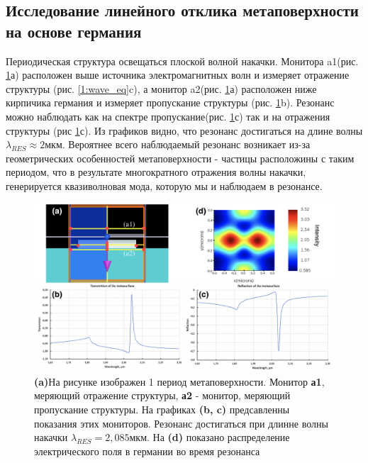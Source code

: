 \subsection{Исследование линейного отклика метаповерхности на основе германия}
\hspace{2mm}
Периодическая структура освещаться плоской волной накачки. Монитора a1(рис.  \ref{base2}а) расположен выше источника электромагнитных волн и измеряет отражение структуры (рис. \ref{1:wave_eq}c), а монитор a2(рис. \ref{base2}а) расположен ниже кирпичика германия и измеряет пропускание структуры (рис. \ref{base2}b). Резонанс можно наблюдать как на спектре пропускание(рис. \ref{base2}с) так и на отражения структуры (рис \ref{base2}с).  Из графиков видно, что резонанс достигаться на длине волны  $\lambda_{RES} \approx 2$мкм. 
\hspace{2mm}
 Вероятнее всего наблюдаемый резонанс возникает из-за геометрических особенностей метаповерхности - частицы расположины с таким периодом, что в результате многократного отражения волны накачки, генерируется квазиволновая мода, которую мы и наблюдаем в резонансе.
\begin{figure}[h]
	\centering
    \includegraphics[width=0.9\linewidth]{images/expert.png}
	\caption{\textbf{(a)}На рисунке изображен 1 период метаповерхности. Монитор \textbf{а1}, меряющий отражение структуры, \textbf{а2} - монитор, меряющий пропускание структуры. На графиках \textbf{(b, c)} предсавленны показания этих мониторов. Резонанс достигаться при длинне волны накачки $\lambda_{RES} = 2,085$мкм. На \textbf{(d)} показано распределение электрического поля в германии во время резонанса}
	\label{base2}
\end{figure}


